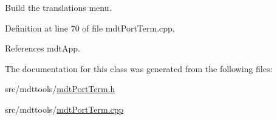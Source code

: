 Build the translations menu. 



Definition at line 70 of file mdt\-Port\-Term.\-cpp.



References mdt\-App.



The documentation for this class was generated from the following files\-:\begin{DoxyCompactItemize}
\item 
src/mdttools/\hyperlink{mdt_port_term_8h}{mdt\-Port\-Term.\-h}\item 
src/mdttools/\hyperlink{mdt_port_term_8cpp}{mdt\-Port\-Term.\-cpp}\end{DoxyCompactItemize}
